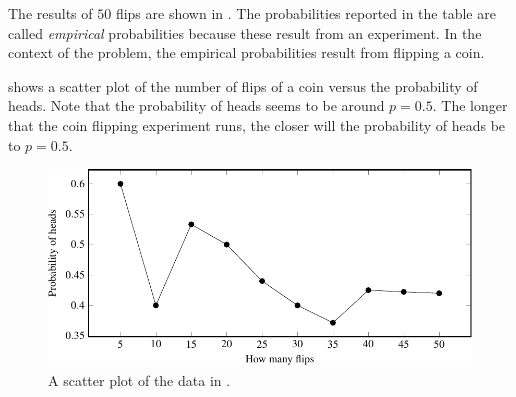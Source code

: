 \documentclass[a4paper,oneside,12pt]{article}
\begin{document}
\begin{problem}
{\begin{solution}
The results of $50$ flips are shown in
.  The probabilities reported
in the table are called \emph{empirical} probabilities because these
result from an experiment.  In the context of the problem, the
empirical probabilities result from flipping a coin.

\begin{table}[!htbp]
\centering

\caption{%
  The probability of heads after a given number of flips of a coin.
}
\label{tab:coin_flip_probability_heads}
\end{table}

 shows a scatter plot of the number
of flips of a coin versus the probability of heads.  Note that the
probability of heads seems to be around $p = 0.5$.  The longer that
the coin flipping experiment runs, the closer will the probability of
heads be to $p = 0.5$.

\begin{figure}[!htbp]
\centering
\includegraphics[scale=1]{image/07/coin-flip-scatterplot.pdf}
\caption{%
  A scatter plot of the data in
  .
}
\label{fig:coin_flip_scatter_plot}
\end{figure}
\end{solution}
}{}
\end{problem}
\end{document}
